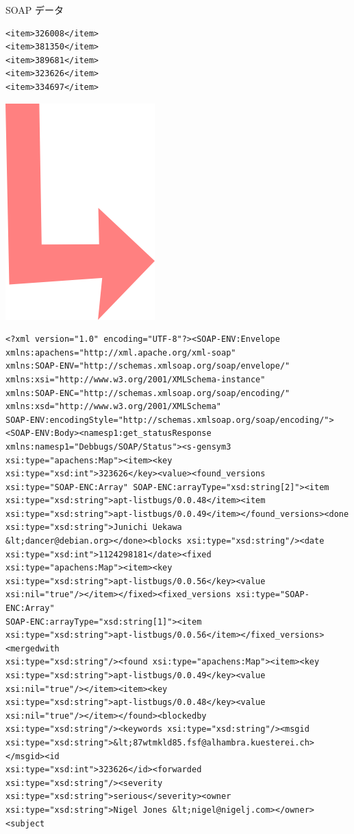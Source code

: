 \documentclass[cjk,dvipdfmx]{beamer}
\begin{document}
\begin{frame}[containsverbatim]{SOAP データ}
\begin{minipage}[t]{0.4\hsize}
  \begin{verbatim}
<item>326008</item>
<item>381350</item>
<item>389681</item>
<item>323626</item>
<item>334697</item>
 \end{verbatim}
\hfill{}\includegraphics[width=0.4\hsize]{image200611/arrow.png}
\end{minipage}
\begin{minipage}[t]{0.5\hsize}
\begin{verbatim}
<?xml version="1.0" encoding="UTF-8"?><SOAP-ENV:Envelope
xmlns:apachens="http://xml.apache.org/xml-soap"
xmlns:SOAP-ENV="http://schemas.xmlsoap.org/soap/envelope/"
xmlns:xsi="http://www.w3.org/2001/XMLSchema-instance"
xmlns:SOAP-ENC="http://schemas.xmlsoap.org/soap/encoding/"
xmlns:xsd="http://www.w3.org/2001/XMLSchema"
SOAP-ENV:encodingStyle="http://schemas.xmlsoap.org/soap/encoding/"><SOAP-ENV:Body><namesp1:get_statusResponse
xmlns:namesp1="Debbugs/SOAP/Status"><s-gensym3
xsi:type="apachens:Map"><item><key
xsi:type="xsd:int">323626</key><value><found_versions
xsi:type="SOAP-ENC:Array" SOAP-ENC:arrayType="xsd:string[2]"><item
xsi:type="xsd:string">apt-listbugs/0.0.48</item><item
xsi:type="xsd:string">apt-listbugs/0.0.49</item></found_versions><done
xsi:type="xsd:string">Junichi Uekawa
&lt;dancer@debian.org></done><blocks xsi:type="xsd:string"/><date
xsi:type="xsd:int">1124298181</date><fixed
xsi:type="apachens:Map"><item><key
xsi:type="xsd:string">apt-listbugs/0.0.56</key><value
xsi:nil="true"/></item></fixed><fixed_versions xsi:type="SOAP-ENC:Array"
SOAP-ENC:arrayType="xsd:string[1]"><item
xsi:type="xsd:string">apt-listbugs/0.0.56</item></fixed_versions><mergedwith
xsi:type="xsd:string"/><found xsi:type="apachens:Map"><item><key
xsi:type="xsd:string">apt-listbugs/0.0.49</key><value
xsi:nil="true"/></item><item><key
xsi:type="xsd:string">apt-listbugs/0.0.48</key><value
xsi:nil="true"/></item></found><blockedby
xsi:type="xsd:string"/><keywords xsi:type="xsd:string"/><msgid
xsi:type="xsd:string">&lt;87wtmkld85.fsf@alhambra.kuesterei.ch></msgid><id
xsi:type="xsd:int">323626</id><forwarded
xsi:type="xsd:string"/><severity
xsi:type="xsd:string">serious</severity><owner
xsi:type="xsd:string">Nigel Jones &lt;nigel@nigelj.com></owner><subject
\end{verbatim}
\end{minipage}
\end{frame}
\end{document}
